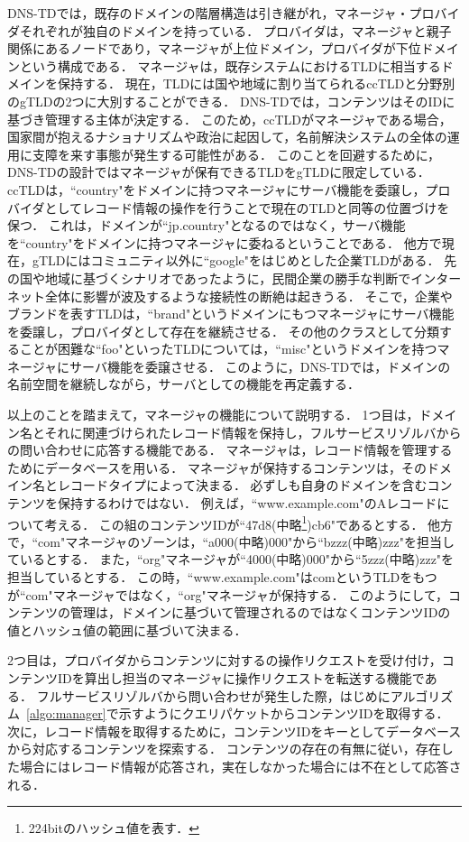DNS-TDでは，既存のドメインの階層構造は引き継がれ，マネージャ・プロバイダそれぞれが独自のドメインを持っている．
プロバイダは，マネージャと親子関係にあるノードであり，マネージャが上位ドメイン，プロバイダが下位ドメインという構成である．
マネージャは，既存システムにおけるTLDに相当するドメインを保持する．
現在，TLDには国や地域に割り当てられるccTLDと分野別のgTLDの2つに大別することができる．
DNS-TDでは，コンテンツはそのIDに基づき管理する主体が決定する．
このため，ccTLDがマネージャである場合，国家間が抱えるナショナリズムや政治に起因して，名前解決システムの全体の運用に支障を来す事態が発生する可能性がある．
このことを回避するために，DNS-TDの設計ではマネージャが保有できるTLDをgTLDに限定している．
ccTLDは，``country"をドメインに持つマネージャにサーバ機能を委譲し，プロバイダとしてレコード情報の操作を行うことで現在のTLDと同等の位置づけを保つ．
これは，ドメインが``jp.country"となるのではなく，サーバ機能を``country"をドメインに持つマネージャに委ねるということである．
他方で現在，gTLDにはコミュニティ以外に``google"をはじめとした企業TLDがある．
先の国や地域に基づくシナリオであったように，民間企業の勝手な判断でインターネット全体に影響が波及するような接続性の断絶は起きうる．
そこで，企業やブランドを表すTLDは，``brand"というドメインにもつマネージャにサーバ機能を委譲し，プロバイダとして存在を継続させる．
その他のクラスとして分類することが困難な``foo"といったTLDについては，``misc"というドメインを持つマネージャにサーバ機能を委譲させる．
このように，DNS-TDでは，ドメインの名前空間を継続しながら，サーバとしての機能を再定義する．

以上のことを踏まえて，マネージャの機能について説明する．
1つ目は，ドメイン名とそれに関連づけられたレコード情報を保持し，フルサービスリゾルバからの問い合わせに応答する機能である．
マネージャは，レコード情報を管理するためにデータベースを用いる．
マネージャが保持するコンテンツは，そのドメイン名とレコードタイプによって決まる．
必ずしも自身のドメインを含むコンテンツを保持するわけではない．
例えば，``www.example.com"のAレコードについて考える．
この組のコンテンツIDが``47d8(中略\footnote{224bitのハッシュ値を表す．})cb6"であるとする．
他方で，``com"マネージャのゾーンは，``a000(中略)000"から``bzzz(中略)zzz"を担当しているとする．
また，``org"マネージャが``4000(中略)000"から``5zzz(中略)zzz"を担当しているとする．
この時，``www.example.com"はcomというTLDをもつが``com"マネージャではなく，``org"マネージャが保持する．
このようにして，コンテンツの管理は，ドメインに基づいて管理されるのではなくコンテンツIDの値とハッシュ値の範囲に基づいて決まる．



2つ目は，プロバイダからコンテンツに対するの操作リクエストを受け付け，コンテンツIDを算出し担当のマネージャに操作リクエストを転送する機能である．
フルサービスリゾルバから問い合わせが発生した際，はじめにアルゴリズム~\ref{algo:manager}で示すようにクエリパケットからコンテンツIDを取得する．
次に，レコード情報を取得するために，コンテンツIDをキーとしてデータベースから対応するコンテンツを探索する．
コンテンツの存在の有無に従い，存在した場合にはレコード情報が応答され，実在しなかった場合には不在として応答される．


